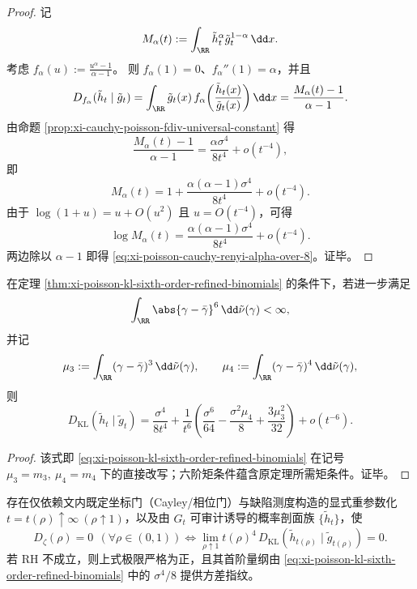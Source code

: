\begin{proof}
记
\[
M_\alpha(t):=\int_{\RR}\tilde h_t^\alpha\tilde g_t^{1-\alpha}\,\dd x.
\]
考虑 \(f_\alpha(u):=\frac{u^\alpha-1}{\alpha-1}\)。
则 \(f_\alpha(1)=0\)、\(f_\alpha''(1)=\alpha\)，并且
\[
D_{f_\alpha}(\tilde h_t\mid \tilde g_t)
=\int_{\RR}\tilde g_t(x)\,f_\alpha\!\left(\frac{\tilde h_t(x)}{\tilde g_t(x)}\right)\dd x
=\frac{M_\alpha(t)-1}{\alpha-1}.
\]
由命题 \ref{prop:xi-cauchy-poisson-fdiv-universal-constant} 得
\[
\frac{M_\alpha(t)-1}{\alpha-1}
=\frac{\alpha\sigma^4}{8t^4}+o(t^{-4}),
\]
即
\[
M_\alpha(t)=1+\frac{\alpha(\alpha-1)\sigma^4}{8t^4}+o(t^{-4}).
\]
由于 \(\log(1+u)=u+O(u^2)\) 且 \(u=O(t^{-4})\)，可得
\[
\log M_\alpha(t)
=\frac{\alpha(\alpha-1)\sigma^4}{8t^4}+o(t^{-4}).
\]
两边除以 \(\alpha-1\) 即得 \eqref{eq:xi-poisson-cauchy-renyi-alpha-over-8}。证毕。
\end{proof}

\begin{corollary}[KL 六阶精化的中心矩记号重写]\label{cor:xi-poisson-cauchy-kl-tminus6-mu34-form}
在定理 \ref{thm:xi-poisson-kl-sixth-order-refined-binomials} 的条件下，若进一步满足
\[
\int_{\RR}\abs{\gamma-\bar\gamma}^6\,\dd\tilde\nu(\gamma)<\infty,
\]
并记
\[
\mu_3:=\int_{\RR}(\gamma-\bar\gamma)^3\,\dd\tilde\nu(\gamma),\qquad
\mu_4:=\int_{\RR}(\gamma-\bar\gamma)^4\,\dd\tilde\nu(\gamma),
\]
则
\begin{equation}\label{eq:xi-poisson-cauchy-kl-tminus6-mu34-form}
D_{\mathrm{KL}}(\tilde h_t\mid \tilde g_t)
=\frac{\sigma^4}{8t^4}
+\frac{1}{t^6}\left(
\frac{\sigma^6}{64}
-\frac{\sigma^2\mu_4}{8}
+\frac{3\mu_3^2}{32}
\right)
+o(t^{-6}).
\end{equation}
\end{corollary}

\begin{proof}
该式即 \eqref{eq:xi-poisson-kl-sixth-order-refined-binomials} 在记号
\(
\mu_3=m_3,\ \mu_4=m_4
\)
下的直接改写；六阶矩条件蕴含原定理所需矩条件。证毕。
\end{proof}

\begin{conjecture}\label{conj:xi-jensen-poisson-defect-alignment-refined}
存在仅依赖文内既定坐标门（Cayley/相位门）与缺陷测度构造的显式重参数化
\(
t=t(\rho)\uparrow\infty\ (\rho\uparrow1)
\)，以及由 \(G_t\) 可审计诱导的概率剖面族 \(\{\tilde h_t\}\)，使
\begin{equation}\label{eq:xi-jensen-poisson-defect-alignment-refined}
D_\zeta(\rho)=0\ \ (\forall \rho\in(0,1))
\Longleftrightarrow
\lim_{\rho\uparrow1}t(\rho)^4\,D_{\mathrm{KL}}(\tilde h_{t(\rho)}\mid \tilde g_{t(\rho)})=0.
\end{equation}
若 RH 不成立，则上式极限严格为正，且其首阶量纲由
\eqref{eq:xi-poisson-kl-sixth-order-refined-binomials}
中的 \(\sigma^4/8\) 提供方差指纹。
\end{conjecture}

\endinput
